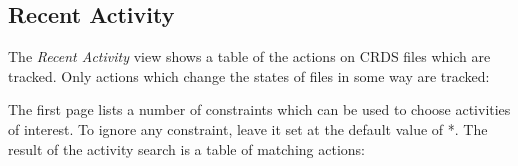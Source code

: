 \documentclass[letterpaper,10pt,english]{sphinxmanual}
\begin{document}
\subsection{Recent Activity}
\label{web_site_use:recent-activity}
The \emph{Recent Activity} view shows a table of the actions on CRDS files which
are tracked.  Only actions which change the states of files in some way are
tracked:
\begin{figure}[htbp]
\centering

\end{figure}

The first page lists a number of constraints which can be used to choose
activities of interest.   To ignore any constraint,  leave it set at the default
value of *.   The result of the activity search is a table of matching actions:
\begin{figure}[htbp]
\centering

\end{figure}
\end{document}
